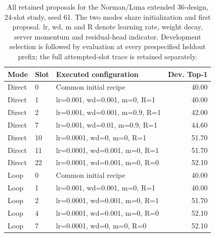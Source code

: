 \begin{table}[htbp]
\caption{All retained proposals for the Norman/Luna extended 36-design, 24-slot study, seed 61. The two modes share initialization and first proposal. lr, wd, m and R denote learning rate, weight decay, server momentum and residual-head indicator. Development selection is followed by evaluation at every prespecified heldout prefix; the full attempted-slot trace is retained separately.}
\label{tab:completed-norman-events}
\centering\small
\setlength{\tabcolsep}{4pt}
\begin{tabularx}{\linewidth}{@{}llXr@{}}
\toprule
Mode & Slot & Executed configuration & Dev. Top-1 \\
\midrule
Direct & 0 & Common initial recipe & 40.00 \\
Direct & 1 & lr=0.001, wd=0.001, m=0, R=1 & 40.00 \\
Direct & 2 & lr=0.001, wd=0.001, m=0.9, R=1 & 42.00 \\
Direct & 7 & lr=0.001, wd=0.01, m=0.9, R=1 & 44.60 \\
Direct & 10 & lr=0.0001, wd=0, m=0, R=1 & 51.70 \\
Direct & 11 & lr=0.0001, wd=0.001, m=0, R=1 & 51.70 \\
Direct & 22 & lr=0.0001, wd=0.001, m=0, R=0 & 52.10 \\
Loop & 0 & Common initial recipe & 40.00 \\
Loop & 1 & lr=0.001, wd=0.001, m=0, R=1 & 40.00 \\
Loop & 2 & lr=0.0001, wd=0.001, m=0, R=1 & 51.70 \\
Loop & 4 & lr=0.0001, wd=0.001, m=0, R=0 & 52.10 \\
Loop & 7 & lr=0.0001, wd=0, m=0, R=0 & 52.10 \\
\bottomrule
\end{tabularx}
\end{table}
